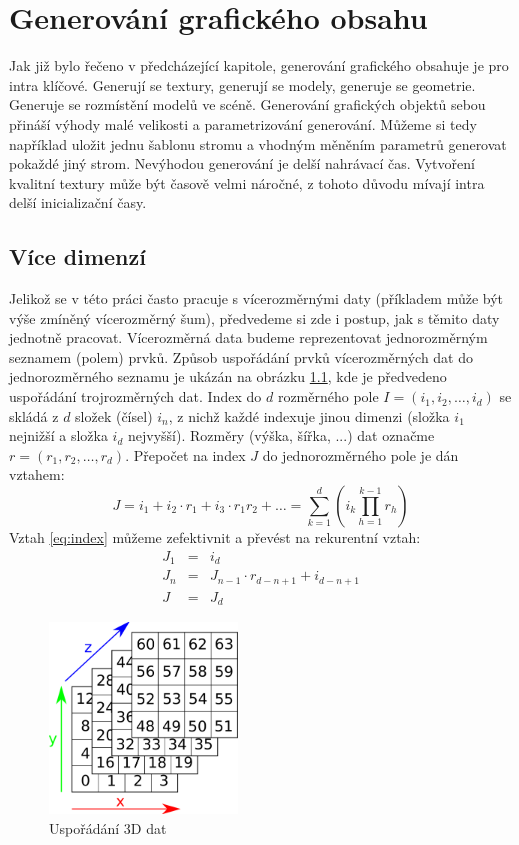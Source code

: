 
\chapter{Generování grafického obsahu}\label{chap:generovani}
Jak již bylo řečeno v předcházející kapitole, generování grafického obsahuje je pro intra klíčové.
Generují se textury, generují se modely, generuje se geometrie.
Generuje se rozmístění modelů ve scéně.
Generování grafických objektů sebou přináší výhody malé velikosti a parametrizování generování.
Můžeme si tedy například uložit jednu šablonu stromu a vhodným měněním parametrů generovat pokaždé jiný strom.
Nevýhodou generování je delší nahrávací čas.
Vytvoření kvalitní textury může být časově velmi náročné, z tohoto důvodu mívají intra delší inicializační časy.



\section{Více dimenzí}
Jelikož se v této práci často pracuje s vícerozměrnými daty (příkladem může být výše zmíněný vícerozměrný šum), předvedeme si zde i postup, jak s těmito daty jednotně pracovat.
Vícerozměrná data budeme reprezentovat jednorozměrným seznamem (polem) prvků.
Způsob uspořádání prvků vícerozměrných dat do jednorozměrného seznamu je ukázán na obrázku \ref{fig:dimenze}, kde je předvedeno uspořádání trojrozměrných dat.
Index do $d$ rozměrného pole $I=(i_1,i_2,\dotsc,i_d)$ se skládá z $d$ složek (čísel) $i_n$, z nichž každé indexuje jinou dimenzi (složka $i_1$ nejnižší a složka $i_d$ nejvyšší).
Rozměry (výška, šířka, ...) dat označme $r=(r_1,r_2,\dotsc,r_d)$.
Přepočet na index $J$ do jednorozměrného pole je dán vztahem:
\begin{equation}
\label{eq:index}
J=i_1 + i_2 \cdot r_1 + i_3 \cdot r_1 r_2 + \dotsc = \sum_{k=1}^{d}\left(i_k \prod_{h=1}^{k-1}r_h \right)
\end{equation}
Vztah \ref{eq:index} můžeme zefektivnit a převést na rekurentní vztah:
\begin{eqnarray*}
\label{eq:fastindex}
J_1 &=& i_d \\
J_n &=& J_{n-1} \cdot r_{d-n+1} + i_{d-n+1} \\
J   &=& J_d
\end{eqnarray*}

\begin{figure}[h]
\centering
\includegraphics[width=5cm,keepaspectratio]{obr/dimenze.pdf}
\caption{Uspořádání 3D dat}
\label{fig:dimenze}
\end{figure}

